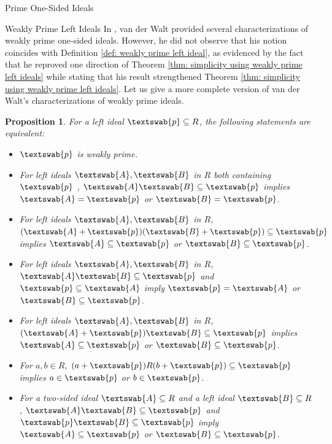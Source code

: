 \documentclass[11pt,a4paper]{article}
\theoremstyle{theorem}
\newtheorem{proposition}[theorem]{Proposition}
\numberwithin{equation}{section}
\begin{document}
\begin{section}{Prime One-Sided Ideals}
\begin{subsection}{Weakly Prime Left Ideals}
	In \cite[Proposition 1.1 and Proposition 1.3]{van1985weakly}, van der Walt provided several characterizations of weakly prime one-sided ideals. However, he did not observe that his notion coincides with Definition \ref{def: weakly prime left ideal}, as evidenced by the fact that he reproved one direction of Theorem \ref{thm: simplicity using weakly prime left ideals} while stating that his result strengthened Theorem \ref{thm: simplicity using weakly prime left ideals}.  Let us give a more complete version of van der Walt's characterizations of weakly prime ideals. 
	 \begin{proposition}\label{prop: characterization of weakly prime ideals}
		For a left ideal \( \textswab{p} \subseteq R \), the following statements are equivalent:
		\begin{itemize}
			\item[(1)] \( \textswab{p} \) is weakly prime.
			\item[(2)] For left ideals \( \textswab{A}, \textswab{B}\)  in \( R \) both containing \( \textswab{p} \) , \( \textswab{A}\textswab{B} \subseteq \textswab{p} \) implies \( \textswab{A} = \textswab{p} \) or \( \textswab{B} = \textswab{p} \).
			\item[(3)] For left ideals \( \textswab{A}, \textswab{B}\)  in \( R \), \( (\textswab{A}+\textswab{p})(\textswab{B}+\textswab{p}) \subseteq \textswab{p} \)  implies \( \textswab{A} \subseteq \textswab{p} \) or \( \textswab{B} \subseteq \textswab{p} \).
			\item[(4)] For left ideals \( \textswab{A}, \textswab{B}\)  in \( R \), \( \textswab{A}\textswab{B} \subseteq \textswab{p} \) and \( \textswab{p} \subseteq \textswab{A} \) imply \( \textswab{p} = \textswab{A} \) or \( \textswab{B} \subseteq \textswab{p} \).
			\item[(5)] For left ideals \( \textswab{A}, \textswab{B}\)  in \( R \), \( (\textswab{A}+\textswab{p})\textswab{B} \subseteq \textswab{p} \)  implies \( \textswab{A} \subseteq \textswab{p} \) or \( \textswab{B} \subseteq \textswab{p} \).
			\item[(6)] For \( a,b\in R\), \((a+\textswab{p})R(b+\textswab{p})\subseteq \textswab{p}\) implies \( a\in \textswab{p} \) or \(b \in \textswab{p} \).
			\item[(7)]  For a two-sided ideal \( \textswab{A} \subseteq R \) and a left ideal  \( \textswab{B} \subseteq R \)  , \( \textswab{A}\textswab{B} \subseteq \textswab{p} \) and \( \textswab{p}\textswab{B}\subseteq\textswab{p}\) imply \( \textswab{A} \subseteq \textswab{p} \) or \( \textswab{B} \subseteq \textswab{p} \).

\end{itemize}
\end{proposition}
\end{subsection}
\end{section}
\end{document}
